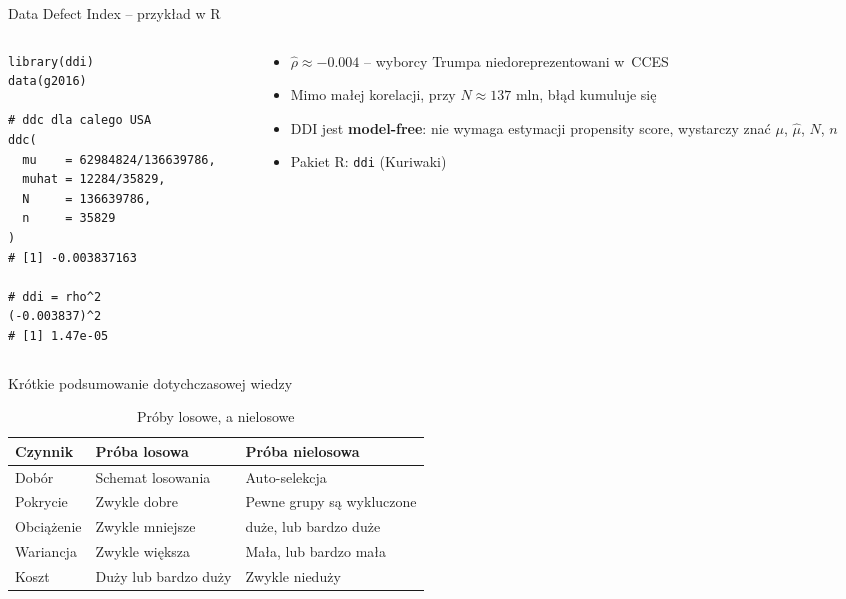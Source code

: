 \documentclass[10pt,ignorenonframetext, aspectratio=169]{beamer}
\begin{document}
\begin{frame}[fragile]{Data Defect Index -- przykład w R}

\begin{columns}
\begin{column}{0.5\textwidth}
\small
\begin{verbatim}
library(ddi)
data(g2016)

# ddc dla calego USA
ddc(
  mu    = 62984824/136639786,
  muhat = 12284/35829,
  N     = 136639786,
  n     = 35829
)
# [1] -0.003837163

# ddi = rho^2
(-0.003837)^2
# [1] 1.47e-05
\end{verbatim}
\end{column}

\begin{column}{0.5\textwidth}
\small
\begin{itemize}
    \item $\hat{\rho} \approx -0.004$ -- wyborcy Trumpa niedoreprezentowani w~CCES
    \item Mimo małej korelacji, przy $N \approx 137$ mln, błąd kumuluje się
    \item DDI jest \textbf{model-free}: nie wymaga estymacji propensity score, wystarczy znać $\mu$, $\hat{\mu}$, $N$, $n$
    \item Pakiet R: \texttt{ddi} (Kuriwaki)
\end{itemize}
\end{column}
\end{columns}
\end{frame}

\begin{frame}{Krótkie podsumowanie dotychczasowej wiedzy}
    \begin{table}
        \centering
        \caption{Próby losowe, a nielosowe}
        \begin{tabular}{lll}
        \hline
        \textbf{Czynnik}     &  \textbf{Próba losowa} & \textbf{Próba nielosowa}\\
        \hline
        Dobór     &  Schemat losowania & Auto-selekcja \\
        Pokrycie     &  Zwykle dobre & Pewne grupy są wykluczone \\
        Obciążenie & Zwykle mniejsze & duże, lub bardzo duże \\
        Wariancja & Zwykle większa & Mała, lub bardzo mała \\
        Koszt & Duży lub bardzo duży & Zwykle nieduży \\
        \hline
        \end{tabular}

    \end{table}
\end{frame}
\end{document}
